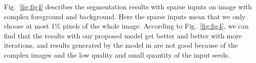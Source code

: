 \documentclass{article}
\begin{document}
%
Fig.~\ref{fig:fig4} describes the segmentation results with sparse inputs on image with complex foreground and background. Here the sparse inputs mean that we only choose at most 1\% pixels of the whole image. According to Fig.~\ref{fig:fig4}, we can find that the results with our proposed model get better and better with more iterations, and results generated by the model in \cite{nguyen2012robust} are not good because of the complex images and the low quality and small quantity of the input seeds.
\end{document}
